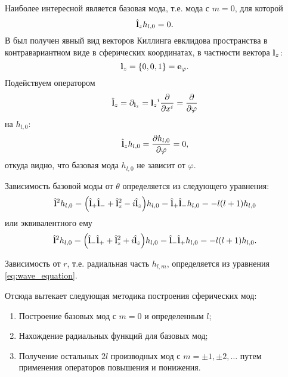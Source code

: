 \documentclass[12pt,a4paper]{article}
\begin{document}
        Наиболее интересной является базовая мода, т.е. мода с $m = 0$, для которой
        \begin{equation}
            \hat{\mathbf{l}}_z h_{l, 0} = 0 .
        \end{equation}
        В \cite{math_appendix} был получен явный вид векторов Киллинга евклидова пространства в контравариантном виде в сферических координатах, в частности вектора $\mathbf{l}_z$:
        \begin{equation}
            \mathbf{l}_z = \qty{ 0, 0, 1 } = \mathbf{e}_\varphi .
        \end{equation}
        Подействуем оператором
        \begin{equation}
            \hat{\mathbf{l}}_z
                = \partial_{\mathbf{l}_z}
                = {\mathbf{l}_z}^i \pdv{x^i}
                = \pdv{\varphi}
        \end{equation}
        на $h_{l, 0}$:
        \begin{equation}
            \hat{\mathbf{l}}_z h_{l, 0} = \pdv{h_{l, 0}}{\varphi} = 0 ,
        \end{equation}
        откуда видно, что базовая мода $h_{l, 0}$ не зависит от $\varphi$.

        Зависимость базовой моды от $\theta$ определяется из следующего уравнения:
        \begin{equation}\label{eq:basemode_op_eq}
            \hat{\mathbf{l}}^2 h_{l, 0}
                = \qty( \hat{\mathbf{l}}_{+} \hat{\mathbf{l}}_{-} + \hat{\mathbf{l}}_z^2 - i \hat{\mathbf{l}}_z ) h_{l, 0}
                = \hat{\mathbf{l}}_{+} \hat{\mathbf{l}}_{-} h_{l, 0}
                = - l (l + 1) h_{l, 0}
        \end{equation}
        или эквивалентного ему
        \begin{equation}
            \hat{\mathbf{l}}^2 h_{l, 0}
                = \qty( \hat{\mathbf{l}}_{-} \hat{\mathbf{l}}_{+} + \hat{\mathbf{l}}_z^2 + i \hat{\mathbf{l}}_z ) h_{l, 0}
                = \hat{\mathbf{l}}_{-} \hat{\mathbf{l}}_{+} h_{l, 0}
                = - l (l + 1) h_{l, 0} .
        \end{equation}

        Зависимость от $r$, т.е. радиальная часть $h_{l, m}$, определяется из уравнения \autoref{eq:wave_equation}.

        Отсюда вытекает следующая методика построения сферических мод:
        \begin{enumerate}[noitemsep]
            \item Построение базовых мод с $m = 0$ и определенным $l$;
            \item Нахождение радиальных функций для базовых мод;
            \item Получение остальных $2l$ производных мод с $m = \pm 1, \pm 2, \dots$ путем применения операторов повышения и понижения.
        \end{enumerate}
\end{document}
